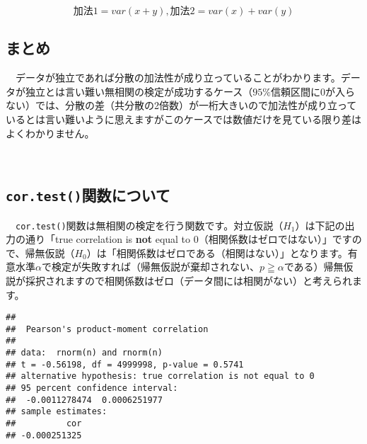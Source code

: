 \documentclass[a4paper]{tufte-handout}
\begin{document}
\begin{table}

\caption{\label{tab:unnamed-chunk-5}ランダムサンプリングしたデータが独立でない場合}
\centering
{}
\end{table}

\[\mbox{加法1} = var(x + y),　\mbox{加法2} = var(x) + var(y)\]

\newpage

\hypertarget{ux307eux3068ux3081}{%
\subsection{まとめ}\label{ux307eux3068ux3081}}

　データが独立であれば分散の加法性が成り立っていることがわかります。データが独立とは言い難い無相関の検定が成功するケース（\(95\%\)信頼区間に\(0\)が入らない）では、分散の差（共分散の2倍数）が一桁大きいので加法性が成り立っているとは言い難いように思えますがこのケースでは数値だけを見ている限り差はよくわかりません。

　

\hypertarget{cor.testux95a2ux6570ux306bux3064ux3044ux3066}{%
\subsection{\texorpdfstring{\texttt{cor.test()}関数について}{cor.test()関数について}}\label{cor.testux95a2ux6570ux306bux3064ux3044ux3066}}

　\texttt{cor.test()}関数は無相関の検定を行う関数です。対立仮説（\(H_1\)）は下記の出力の通り「true
correlation is \textbf{not} equal to
0（相関係数はゼロではない）」ですので、帰無仮説（\(H_0\)）は「相関係数はゼロである（相関はない）」となります。有意水準\(\alpha\)で検定が失敗すれば（帰無仮説が棄却されない、\(p \geqq \alpha\)である）帰無仮説が採択されますので相関係数はゼロ（データ間には相関がない）と考えられます。

\begin{verbatim}
## 
##  Pearson's product-moment correlation
## 
## data:  rnorm(n) and rnorm(n)
## t = -0.56198, df = 4999998, p-value = 0.5741
## alternative hypothesis: true correlation is not equal to 0
## 95 percent confidence interval:
##  -0.0011278474  0.0006251977
## sample estimates:
##          cor 
## -0.000251325
\end{verbatim}
\end{document}
